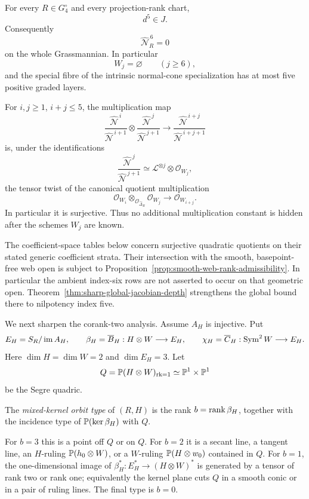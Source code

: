 \begin{theorem}
\label{thm:finite-all-corank-depth}
For every \(R\in G_4^\circ\) and every projection-rank chart,
\begin{equation}\label{eq:d5-in-J}
 d^5\in J.
\end{equation}
Consequently
\[
 \widehat{\mathcal N}_R^{\,6}=0
\]
on the whole Grassmannian.  In particular
\[
 W_j=\varnothing\qquad(j\ge6),
\]
and the special fibre of the intrinsic normal-cone specialization has
at most five positive graded layers.

For \(i,j\ge1\), \(i+j\le5\), the multiplication map
\[
 \frac{\widehat{\mathcal N}^{\,i}}
      {\widehat{\mathcal N}^{\,i+1}}
 \otimes
 \frac{\widehat{\mathcal N}^{\,j}}
      {\widehat{\mathcal N}^{\,j+1}}
 \longrightarrow
 \frac{\widehat{\mathcal N}^{\,i+j}}
      {\widehat{\mathcal N}^{\,i+j+1}}
\]
is, under the identifications
\[
 \frac{\widehat{\mathcal N}^{\,j}}
      {\widehat{\mathcal N}^{\,j+1}}
 \simeq
 \mathcal L^{\otimes j}\otimes\mathcal O_{W_j},
\]
the tensor twist of the canonical quotient multiplication
\begin{equation}\label{eq:atlas-multiplication}
 \mathcal O_{W_i}\otimes_{\mathcal O_{\widehat\Delta_R}}
 \mathcal O_{W_j}
 \longrightarrow
 \mathcal O_{W_{i+j}}.
\end{equation}
In particular it is surjective.  Thus no additional multiplication
constant is hidden after the schemes \(W_j\) are known.
\end{theorem}

The coefficient-space tables below concern surjective quadratic
quotients on their stated generic coefficient strata.  Their intersection
with the smooth, basepoint-free web open is subject to
Proposition~\ref{prop:smooth-web-rank-admissibility}.  In particular the
ambient index-six rows are not asserted to occur on that geometric open.
Theorem~\ref{thm:sharp-global-jacobian-depth} strengthens the global
bound there to nilpotency index five.

We next sharpen the corank-two analysis.  Assume \(A_H\) is
injective.  Put
\[
 E_H=S_R/\operatorname{im} A_H,\qquad
 \beta_H=\overline B_H:H\otimes W\longrightarrow E_H,\qquad
 \chi_H=\overline C_H:\operatorname{Sym}^2W\longrightarrow E_H.
\]
Here \(\dim H=\dim W=2\) and \(\dim E_H=3\).  Let
\[
 Q=\mathbb P(H\otimes W)_{\operatorname{rk}=1}
   \simeq\mathbb P^1\times\mathbb P^1
\]
be the Segre quadric.

\begin{definition}
\label{def:mixed-kernel-orbit-type}
The \emph{mixed-kernel orbit type} of \((R,H)\) is the rank
\(b=\operatorname{rank}\beta_H\), together with the incidence type of
\(\mathbb P(\ker\beta_H)\) with \(Q\).

For \(b=3\) this is a point off \(Q\) or on \(Q\).  For \(b=2\)
it is a secant line, a tangent line, an \(H\)-ruling
\(\mathbb P(h_0\otimes W)\), or a \(W\)-ruling
\(\mathbb P(H\otimes w_0)\) contained in \(Q\).  For \(b=1\), the one-dimensional image of
\(\beta_H^*:E_H^*\to(H\otimes W)^*\) is generated by a tensor of
rank two or rank one; equivalently the kernel plane cuts \(Q\) in a
smooth conic or in a pair of ruling lines.  The final type is
\(b=0\).
\end{definition}

